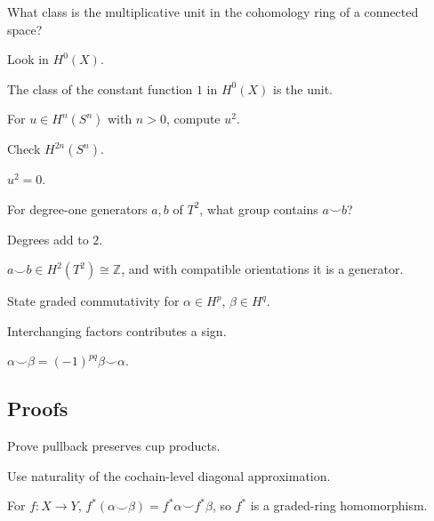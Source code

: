 \begin{exercise}[Unit]\label{exr:viii29-ped-02}
What class is the multiplicative unit in the cohomology ring of a connected space?
\end{exercise}
\begin{hint}
Look in $H^0(X)$.
\end{hint}
\begin{solution}
The class of the constant function $1$ in $H^0(X)$ is the unit.
\end{solution}

\begin{exercise}\label{exr:viii29-ped-03}
For $u\in H^n(S^n)$ with $n>0$, compute $u^2$.
\end{exercise}
\begin{hint}
Check $H^{2n}(S^n)$.
\end{hint}
\begin{solution}
$u^2=0$.
\end{solution}

\begin{exercise}\label{exr:viii29-ped-04}
For degree-one generators $a,b$ of $T^2$, what group contains $a\smile b$?
\end{exercise}
\begin{hint}
Degrees add to $2$.
\end{hint}
\begin{solution}
$a\smile b\in H^2(T^2)\cong\mathbb Z$, and with compatible orientations it is a generator.
\end{solution}

\begin{exercise}\label{exr:viii29-ped-05}
State graded commutativity for $\alpha\in H^p$, $\beta\in H^q$.
\end{exercise}
\begin{hint}
Interchanging factors contributes a sign.
\end{hint}
\begin{solution}
$\alpha\smile\beta=(-1)^{pq}\beta\smile\alpha$.
\end{solution}

\subsection*{Proofs}

\begin{exercise}[Naturality]\label{exr:viii29-ped-06}
Prove pullback preserves cup products.
\end{exercise}
\begin{hint}
Use naturality of the cochain-level diagonal approximation.
\end{hint}
\begin{solution}
For $f:X\to Y$, $f^*(\alpha\smile\beta)=f^*\alpha\smile f^*\beta$, so $f^*$ is a graded-ring homomorphism.
\end{solution}

